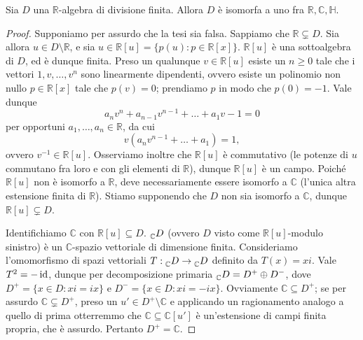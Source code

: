 \begin{proposition}
Sia $D$ una $\mathbb{R}$-algebra di divisione finita. Allora $D$ è isomorfa a uno fra $\mathbb{R}\comma\mathbb{C}\comma\mathbb{H}$.
\end{proposition}
\begin{proof}
Supponiamo per assurdo che la tesi sia falsa. Sappiamo che $\mathbb{R}\subsetneq D$. Sia allora $u\in D\setminus\mathbb{R}$, e sia $u\in\mathbb{R}[u]=\{p(u):p\in\mathbb{R}[x]\}$. $\mathbb{R}[u]$ è una sottoalgebra di $D$, ed è dunque finita. Preso un qualunque $v\in\mathbb{R}[u]$ esiste un $n\ge 0$ tale che i vettori $1,v,\ldots,v^n$ sono linearmente dipendenti, ovvero esiste un polinomio non nullo $p\in\mathbb{R}[x]$ tale che $p(v)=0$; prendiamo $p$ in modo che $p(0)=-1$. Vale dunque 
$$
a_nv^n+a_{n-1}v^{n-1}+\ldots+a_1v-1=0
$$
per opportuni $a_1,\ldots,a_n\in\mathbb{R}$, da cui
$$
v(a_nv^{n-1}+\ldots+a_1)=1,
$$
ovvero $v^{-1}\in\mathbb{R}[u]$. Osserviamo inoltre che $\mathbb{R}[u]$ è commutativo (le potenze di $u$ commutano fra loro e con gli elementi di $\mathbb{R}$), dunque $\mathbb{R}[u]$ è un campo. Poiché $\mathbb{R}[u]$ non è isomorfo a $\mathbb{R}$, deve necessariamente essere isomorfo a $\mathbb{C}$ (l'unica altra estensione finita di $\mathbb{R}$). Stiamo supponendo che $D$ non sia isomorfo a $\mathbb{C}$, dunque $\mathbb{R}[u]\subsetneq D$.

Identifichiamo $\mathbb{C}$ con $\mathbb{R}[u]\subseteq D$. $\prescript{}{\mathbb{C}}{D}$ (ovvero $D$ visto come $\mathbb{R}[u]$-modulo sinistro) è un $\mathbb{C}$-spazio vettoriale di dimensione finita. Consideriamo l'omomorfismo di spazi vettoriali $T:\prescript{}{\mathbb{C}}{D}\to\prescript{}{\mathbb{C}}{D}$ definito da $T(x)=xi$. Vale $T^2=-\operatorname{id}$, dunque per decomposizione primaria $\prescript{}{\mathbb{C}}{D}=D^+\oplus D^-$, dove $D^+=\{x\in D:xi=ix\}$ e $D^-=\{x\in D:xi=-ix\}$. Ovviamente $\mathbb{C}\subseteq D^+$; se per assurdo $\mathbb{C}\subsetneq D^+$, preso un $u'\in D^+\setminus\mathbb{C}$ e applicando un ragionamento analogo a quello di prima otterremmo che $\mathbb{C}\subseteq\mathbb{C}[u']$ è un'estensione di campi finita propria, che è assurdo. Pertanto $D^+=\mathbb{C}$.


\end{proof}
